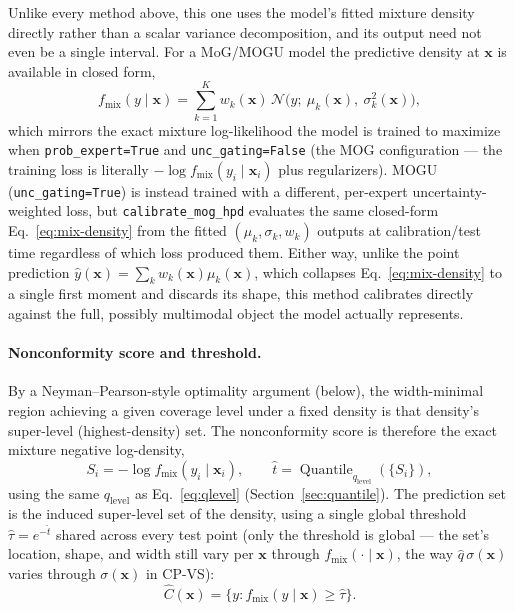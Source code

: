\documentclass[11pt]{article}
\begin{document}
Unlike every method above, this one uses the model's fitted mixture density directly rather
than a scalar variance decomposition, and its output need not even be a single interval. For a
MoG/MOGU model the predictive density at $\bm{x}$ is available in closed form,
\begin{equation}
f_{\mathrm{mix}}(y \mid \bm{x}) = \sum_{k=1}^K w_k(\bm{x}) \, \mathcal{N}\big(y;\ \mu_k(\bm{x}),\
\sigma_k^2(\bm{x})\big),
\label{eq:mix-density}
\end{equation}
which mirrors the exact mixture log-likelihood the model is trained to maximize when
\texttt{prob\_expert=True} and \texttt{unc\_gating=False} (the MOG configuration — the training
loss is literally $-\log f_{\mathrm{mix}}(y_i\mid\bm x_i)$ plus regularizers). MOGU
(\texttt{unc\_gating=True}) is instead trained with a different, per-expert
uncertainty-weighted loss, but \texttt{calibrate\_mog\_hpd} evaluates the same closed-form
Eq.~\eqref{eq:mix-density} from the fitted $(\mu_k,\sigma_k,w_k)$ outputs at calibration/test
time regardless of which loss produced them. Either way, unlike the point prediction
$\hat y(\bm x) = \sum_k w_k(\bm x)\mu_k(\bm x)$, which collapses Eq.~\eqref{eq:mix-density} to a
single first moment and discards its shape, this method calibrates directly against the full,
possibly multimodal object the model actually represents.

\paragraph{Nonconformity score and threshold.} By a Neyman--Pearson-style optimality argument
(below), the width-minimal region achieving a given coverage level under a fixed density is that
density's super-level (highest-density) set. The nonconformity score is therefore the exact
mixture negative log-density,
\begin{equation}
S_i = -\log f_{\mathrm{mix}}(y_i \mid \bm{x}_i), \qquad
\hat t = \operatorname{Quantile}_{q_{\mathrm{level}}}(\{S_i\}),
\label{eq:hpd-score}
\end{equation}
using the same $q_{\mathrm{level}}$ as Eq.~\eqref{eq:qlevel} (Section~\ref{sec:quantile}). The
prediction set is the induced super-level set of the density, using a single global threshold
$\hat\tau = e^{-\hat t}$ shared across every test point (only the threshold is global — the
set's location, shape, and width still vary per $\bm{x}$ through
$f_{\mathrm{mix}}(\cdot\mid\bm{x})$,
the way $\hat q\,\sigma(\bm x)$ varies through $\sigma(\bm x)$ in CP-VS):
\begin{equation}
\hat C(\bm{x}) = \{y : f_{\mathrm{mix}}(y\mid\bm{x}) \ge \hat\tau\}.
\label{eq:hpd-region}
\end{equation}
\end{document}
